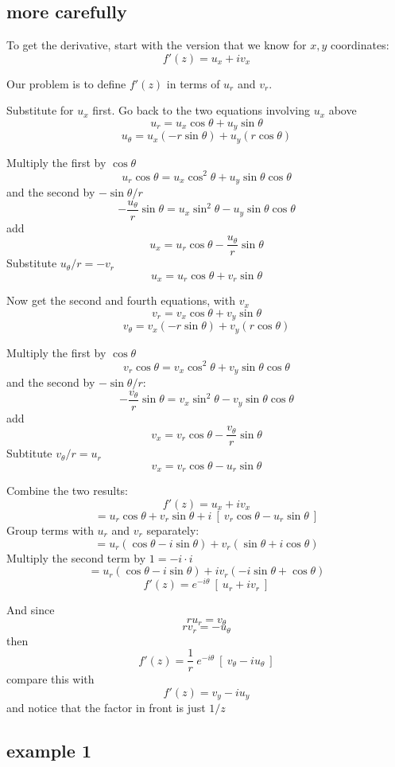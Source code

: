 \documentclass[11pt, oneside]{article}   	%
\begin{document}
\subsection*{more carefully}

To get the derivative, start with the version that we know for $x,y$ coordinates:
\[ f'(z) = u_x + i v_x \]

Our problem is to define $f'(z)$ in terms of $u_r$ and $v_r$.

Substitute for $u_x$ first.  Go back to the two equations involving $u_x$ above
\[ u_r = u_x \cos \theta + u_y \sin \theta \]
\[ u_{\theta} = u_x (-r \sin \theta) + u_y (r \cos \theta) \]

Multiply the first by $\cos \theta$
\[ u_r \cos \theta = u_x \cos^2 \theta + u_y \sin \theta \cos \theta \]
 and the second by $- \sin \theta/r$
\[ - \frac{u_{\theta}}{r} \sin \theta = u_x  \sin^2 \theta - u_y \sin \theta \cos \theta \]
add
\[ u_x = u_r \cos \theta - \frac{u_{\theta}}{r} \sin \theta \]
Substitute $u_{\theta}/r = - v_r$
\[ u_x = u_r \cos \theta + v_r \sin \theta \]

Now get the second and fourth equations, with $v_x$
\[ v_r = v_x \cos \theta + v_y \sin \theta \]
\[ v_{\theta} = v_x (-r \sin \theta) + v_y (r \cos \theta) \]

Multiply the first by $\cos \theta$
\[ v_r \cos \theta = v_x \cos^2 \theta + v_y \sin \theta \cos \theta \]
and the second by $-\sin \theta / r$:
\[ -\frac{v_{\theta}}{r} \sin \theta = v_x \sin^2 \theta - v_y \sin \theta \cos \theta \]
add
\[ v_x = v_r \cos \theta -\frac{v_{\theta}}{r} \sin \theta \]
Subtitute $v_{\theta}/r = u_r$
\[ v_x = v_r \cos \theta - u_r \sin \theta \]

Combine the two results:
\[ f'(z) = u_x + i v_x \]
\[ = u_r \cos \theta + v_r \sin \theta + i \ [ \ v_r \cos \theta - u_r \sin \theta \ ] \]
Group terms with $u_r$ and $v_r$ separately:
\[ = u_r (\cos \theta - i \sin \theta) + v_r (\sin \theta + i \cos \theta)  \]
Multiply the second term by $1 = - i \cdot i$
\[ = u_r (\cos \theta - i \sin \theta) + i v_r (- i \sin \theta + \cos \theta)  \]
\[ f'(z) = e^{-i \theta} \ [ \ u_r + i v_r \ ] \]

And since
\[ r u_r = v_{\theta} \]
\[ r v_r = -u_{\theta} \]
then
\[ f'(z) = \frac{1}{r} \ e^{-i \theta} \ [ \ v_{\theta} - i u_{\theta} \ ] \]
compare this with 
\[ f'(z) = v_y - iu_y \]
and notice that the factor in front is just $1/z$

\subsection*{example 1}
\end{document}
